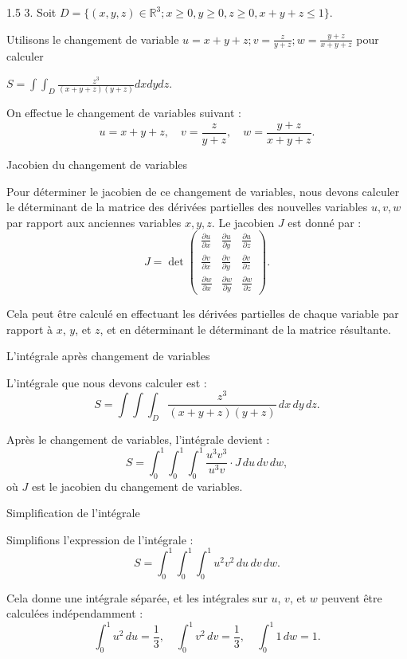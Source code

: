 \documentclass[12pt]{article}
\begin{document}
\begin{spacing}{1.5}
3. Soit $D=\lbrace (x,y,z)\in \mathbb{R}^3;x\geq 0,y\geq 0,z\geq 0,x+y+z\leq 1 \rbrace$.

Utilisons le changement de variable $u=x+y+z; v=\frac{z}{y+z}; w=\frac{y+z}{x+y+z}$ pour calculer

$S=\int\int_D\frac{z^3}{(x+y+z)(y+z)}dxdydz$.

On effectue le changement de variables suivant :
\[
u = x + y + z, \quad v = \frac{z}{y + z}, \quad w = \frac{y + z}{x + y + z}.
\]

 Jacobien du changement de variables

Pour déterminer le jacobien de ce changement de variables, nous devons calculer le déterminant de la matrice des dérivées partielles des nouvelles variables \( u, v, w \) par rapport aux anciennes variables \( x, y, z \). Le jacobien \( J \) est donné par :
\[
J = \det \begin{pmatrix} 
\frac{\partial u}{\partial x} & \frac{\partial u}{\partial y} & \frac{\partial u}{\partial z} \\
\frac{\partial v}{\partial x} & \frac{\partial v}{\partial y} & \frac{\partial v}{\partial z} \\
\frac{\partial w}{\partial x} & \frac{\partial w}{\partial y} & \frac{\partial w}{\partial z}
\end{pmatrix}.
\]

Cela peut être calculé en effectuant les dérivées partielles de chaque variable par rapport à \( x \), \( y \), et \( z \), et en déterminant le déterminant de la matrice résultante.

 L'intégrale après changement de variables

L'intégrale que nous devons calculer est :
\[
S = \int \int \int_D \frac{z^3}{(x + y + z)(y + z)} \, dx \, dy \, dz.
\]

Après le changement de variables, l'intégrale devient :
\[
S = \int_0^1 \int_0^1 \int_0^1 \frac{u^3 v^3}{u^3 v} \cdot J \, du \, dv \, dw,
\]
où \( J \) est le jacobien du changement de variables.

 Simplification de l'intégrale

Simplifions l'expression de l'intégrale :
\[
S = \int_0^1 \int_0^1 \int_0^1 u^2 v^2 \, du \, dv \, dw.
\]

Cela donne une intégrale séparée, et les intégrales sur \( u \), \( v \), et \( w \) peuvent être calculées indépendamment :
\[
\int_0^1 u^2 \, du = \frac{1}{3}, \quad \int_0^1 v^2 \, dv = \frac{1}{3}, \quad \int_0^1 1 \, dw = 1.
\]


\end{spacing}
\end{document}
